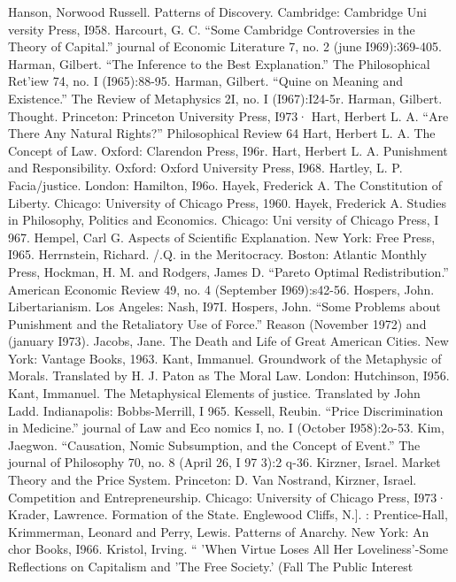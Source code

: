 \documentclass[11pt,openany]{book}
\begin{document}
{Hanson, Norwood Russell. Patterns of Discovery. Cambridge: Cambridge Uni versity Press, I958. Harcourt, G. C. ``Some Cambridge Controversies in the Theory of Capital.'' journal of Economic Literature 7, no. 2 (june I969):369-405. Harman, Gilbert. ``The Inference to the Best Explanation.'' The Philosophical Ret'iew 74, no. I (I965):88-95. Harman, Gilbert. ``Quine on Meaning and Existence.'' The Review of Metaphysics 2I, no. I (I967):I24-5r. Harman, Gilbert. Thought. Princeton: Princeton University Press, I973· Hart, Herbert L. A. ``Are There Any Natural Rights?'' Philosophical Review 64 Hart, Herbert L. A. The Concept of Law. Oxford: Clarendon Press, I96r. Hart, Herbert L. A. Punishment and Responsibility. Oxford: Oxford University Press, I968. Hartley, L. P. Facia/justice. London: Hamilton, I96o. Hayek, Frederick A. The Constitution of Liberty. Chicago: University of Chicago Press, 1960. Hayek, Frederick A. Studies in Philosophy, Politics and Economics. Chicago: Uni versity of Chicago Press, I 967. Hempel, Carl G. Aspects of Scientific Explanation. New York: Free Press, I965. Herrnstein, Richard. /.Q. in the Meritocracy. Boston: Atlantic Monthly Press, Hockman, H. M. and Rodgers, James D. ``Pareto Optimal Redistribution.'' American Economic Review 49, no. 4 (September I969):s42-56. Hospers, John. Libertarianism. Los Angeles: Nash, I97I. Hospers, John. ``Some Problems about Punishment and the Retaliatory Use of Force.'' Reason (November 1972) and (january I973). Jacobs, Jane. The Death and Life of Great American Cities. New York: Vantage Books, 1963. Kant, Immanuel. Groundwork of the Metaphysic of Morals. Translated by H. J. Paton as The Moral Law. London: Hutchinson, I956. Kant, Immanuel. The Metaphysical Elements of justice. Translated by John Ladd. Indianapolis: Bobbs-Merrill, I 965. Kessell, Reubin. ``Price Discrimination in Medicine.'' journal of Law and Eco nomics I, no. I (October I958):2o-53. Kim, Jaegwon. ``Causation, Nomic Subsumption, and the Concept of Event.'' The journal of Philosophy 70, no. 8 (April 26, I 97 3):2 q-36. Kirzner, Israel. Market Theory and the Price System. Princeton: D. Van Nostrand, Kirzner, Israel. Competition and Entrepreneurship. Chicago: University of Chicago Press, I973· Krader, Lawrence. Formation of the State. Englewood Cliffs, N.]. : Prentice-Hall, Krimmerman, Leonard and Perry, Lewis. Patterns of Anarchy. New York: An chor Books, I966. Kristol, Irving. `` 'When Virtue Loses All Her Loveliness'-Some Reflections on Capitalism and 'The Free Society.' (Fall The Public Interest\par

}
\end{document}
